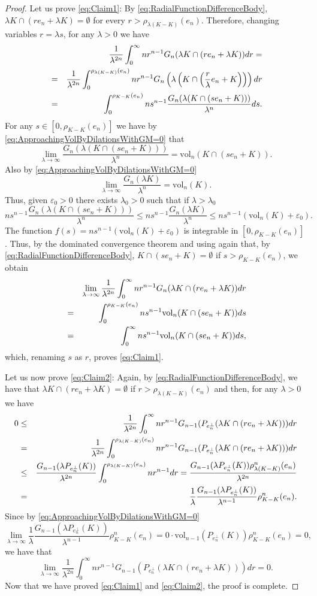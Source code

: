 \documentclass[10pt,a4paper]{amsart}
\def\vol{\mathrm{vol}}
\begin{document}
\begin{proof}
Let us prove \eqref{eq:Claim1}: By \eqref{eq:RadialFunctionDifferenceBody}, $\lambda K\cap(re_n+\lambda K)=\emptyset$ for every $r>\rho_{\lambda(K-K)}(e_n)$. Therefore, changing variables $r=\lambda s$, for any $\lambda>0$ we have
\begin{eqnarray*}
&&\frac{1}{\lambda^{2n}}\int_0^\infty nr^{n-1}G_n(\lambda K\cap(re_n+\lambda K))dr=\cr
&=&\frac{1}{\lambda^{2n}}\int_0^{\rho_{\lambda(K-K)}(e_n)} nr^{n-1}G_n\left(\lambda\left( K\cap\left(\frac{r}{\lambda} e_n+ K\right)\right)\right)dr\cr
&=&\int_0^{\rho_{K-K}(e_n)} ns^{n-1}\frac{G_n(\lambda(K\cap(s e_n+ K)))}{\lambda^n}ds.\cr
\end{eqnarray*}
For any $s\in[0,\rho_{K-K}(e_n)]$ we have by \eqref{eq:ApproachingVolByDilationsWithGM=0} that
$$
\lim_{\lambda\to\infty}\frac{G_n(\lambda(K\cap(s e_n+ K)))}{\lambda^n}=\vol_n(K\cap (se_n+K)).
$$
Also by \eqref{eq:ApproachingVolByDilationsWithGM=0}
$$
\lim_{\lambda\to\infty}\frac{G_n(\lambda K)}{\lambda^n}=\vol_n(K).
$$
Thus, given $\varepsilon_0>0$ there exists $\lambda_0>0$ such that if $\lambda>\lambda_0$
$$
ns^{n-1}\frac{G_n(\lambda(K\cap(s e_n+ K)))}{\lambda^n}\leq ns^{n-1}\frac{G_n(\lambda K)}{\lambda^n}\leq ns^{n-1}(\vol_n(K)+\varepsilon_0).
$$
The function $f(s)=ns^{n-1}(\vol_n(K)+\varepsilon_0)$ is integrable in $[0,\rho_{K-K}(e_n)]$. Thus, by the dominated convergence theorem and using again that, by \eqref{eq:RadialFunctionDifferenceBody}, $K\cap(se_n+ K)=\emptyset$ if $s>\rho_{K-K}(e_n)$, we obtain
\begin{eqnarray*}
&&\lim_{\lambda\to\infty}\frac{1}{\lambda^{2n}}\int_0^\infty nr^{n-1}G_n(\lambda K\cap(re_n+\lambda K))dr\cr
&=&\int_0^{\rho_{K-K}(e_n)}ns^{n-1}\vol_n(K\cap(se_n+ K))ds\cr
&=&\int_0^{\infty}ns^{n-1}\vol_n(K\cap(se_n+ K))ds,\cr
\end{eqnarray*}
which, renaming $s$ as $r$, proves \eqref{eq:Claim1}.

Let us now prove \eqref{eq:Claim2}: Again, by \eqref{eq:RadialFunctionDifferenceBody}, we have that $\lambda K\cap(re_n+\lambda K)=\emptyset$ if $r>\rho_{\lambda(K-K)}(e_n)$ and then, for any $\lambda>0$ we have
\begin{eqnarray*}
0&\leq&\frac{1}{\lambda^{2n}}\int_0^\infty nr^{n-1}G_{n-1}(P_{e_n^\perp}(\lambda K\cap(re_n+\lambda K)))dr\cr
&=&\frac{1}{\lambda^{2n}}\int_0^{\rho_{\lambda(K-K)}(e_n)} nr^{n-1}G_{n-1}(P_{e_n^\perp}(\lambda K\cap(re_n+\lambda K)))dr\cr
&\leq& \frac{G_{n-1}(\lambda P_{e_n^\perp}(K))}{\lambda^{2n}}\int_0^{\rho_{\lambda(K-K)}(e_n)}nr^{n-1}dr=\frac{G_{n-1}(\lambda P_{e_n^\perp}(K))\rho_{\lambda(K-K)}^n(e_n)}{\lambda^{2n}}\cr
&=&\frac{1}{\lambda}\frac{G_{n-1}(\lambda P_{e_n^\perp}(K))}{\lambda^{n-1}}\rho_{K-K}^n(e_n).
\end{eqnarray*}
Since by \eqref{eq:ApproachingVolByDilationsWithGM=0}
$$
\lim_{\lambda\to\infty}\frac{1}{\lambda}\frac{G_{n-1}(\lambda P_{e_n^\perp}(K))}{\lambda^{n-1}}\rho_{K-K}^n(e_n)=0\cdot\vol_{n-1}(P_{e_n^\perp}(K))\rho_{K-K}^n(e_n)=0,
$$
we have that
$$
\lim_{\lambda\to\infty}\frac{1}{\lambda^{2n}}\int_0^\infty nr^{n-1}G_{n-1}(P_{e_n^\perp}(\lambda K\cap(re_n+\lambda K)))dr=0.
$$
Now that we have proved \eqref{eq:Claim1} and \eqref{eq:Claim2}, the proof is complete.
\end{proof}
\end{document}
